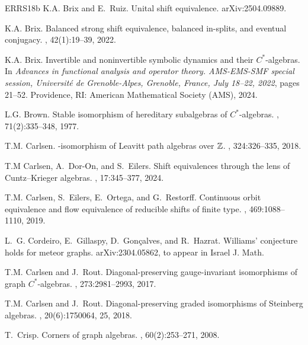 \documentclass[12pt]{amsbook}%
\theoremstyle{defin}
\theoremstyle{remark}
\numberwithin{equation}{chapter}
\numberwithin{theor}{section}
\begin{document}
\begin{thebibliography}{ERRS18b}
K.A. Brix and E.~{Ruiz}.
\newblock Unital shift equivalence.
\newblock arXiv:2504.09889.



K.A. Brix.
\newblock Balanced strong shift equivalence, balanced in-splits, and eventual
  conjugacy.
, 42(1):19--39, 2022.

K.A. Brix.
\newblock Invertible and noninvertible symbolic dynamics and their
  {{\(C^*\)}}-algebras.
\newblock In {\em Advances in functional analysis and operator theory.
  AMS-EMS-SMF special session, Universit\'e de Grenoble-Alpes, Grenoble,
  France, July 18--22, 2022}, pages 21--52. Providence, RI: American
  Mathematical Society (AMS), 2024.

L.G. Brown.
\newblock Stable isomorphism of hereditary subalgebras of {$C^*$}-algebras.
, 71(2):335--348, 1977.

T.M. Carlsen.
\newblock {$\ast$}-isomorphism of {L}eavitt path algebras over {$\Bbb Z$}.
, 324:326--335, 2018.

T.M Carlsen, A.~Dor-On, and S.~Eilers.
\newblock Shift equivalences through the lens of {C}untz--{K}rieger algebras.
, 17:345--377, 2024.

T.M. Carlsen, S.~Eilers, E.~Ortega, and G.~Restorff.
\newblock Continuous orbit equivalence and flow equivalence of reducible shifts
  of finite type.
, 469:1088--1110, 2019.

L.~G. Cordeiro, E.~Gillaspy, D.~Gon{\c c}alves, and R.~Hazrat.
\newblock Williams' conjecture holds for meteor graphs.
\newblock arXiv:2304.05862, to appear in Israel J. Math.

T.M. Carlsen and J.~Rout.
\newblock Diagonal-preserving gauge-invariant isomorphisms of graph
  {$C^*$}-algebras.
, 273:2981--2993, 2017.

T.M. Carlsen and J.~Rout.
\newblock Diagonal-preserving graded isomorphisms of {S}teinberg algebras.
, 20(6):1750064, 25, 2018.

T.~Crisp.
\newblock Corners of graph algebras.
, 60(2):253--271, 2008.


\end{thebibliography}
\end{document}
